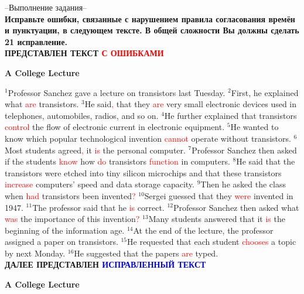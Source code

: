\documentclass[main.tex]{subfiles}
\begin{document}
--Выполнение задания--
\\

\textbf{Исправьте ошибки, связанные с нарушением правила согласования времён и пунктуации, в следующем тексте. В общей сложности Вы должны сделать 21 исправление.}
\\

\textbf{ПРЕДСТАВЛЕН ТЕКСТ \textcolor{red}{С ОШИБКАМИ}}

\centerline{\textbf{A College Lecture}}

$^1$Professor Sanchez gave a lecture on transistors last Tuesday.
$^2$First, he explained what \textcolor{red}{are} transistors.
$^3$He said\textcolor{red}{,} that they \textcolor{red}{are} very small electronic devices used in telephones, automobiles, radios, and so on.
$^4$He further explained that transistors \textcolor{red}{control} the flow of electronic current in electronic equipment.
$^5$He wanted to know which popular technological invention \textcolor{red}{cannot} operate without transistors.
$^6$Most students agreed\textcolor{red}{,} it \textcolor{red}{is} the personal computer.
$^7$Professor Sanchez then asked if the students \textcolor{red}{know} how \textcolor{red}{do} transistors \textcolor{red}{function} in computers.
$^8$He said that the transistors were etched into tiny silicon microchips and that these transistors \textcolor{red}{increase} computers' speed and data storage capacity.
$^9$Then he asked the class when \textcolor{red}{had} transistors been invented\textcolor{red}{?}
$^{10}$Sergei guessed that they \textcolor{red}{were} invented in 1947.
$^{11}$The professor said that he \textcolor{red}{is} correct.
$^{12}$Professor Sanchez then asked what \textcolor{red}{was} the importance of this invention\textcolor{red}{?}
$^{13}$Many students answered that it \textcolor{red}{is} the beginning of the information age.
$^{14}$At the end of the lecture, the professor assigned a paper on transistors.
$^{15}$He requested that each student \textcolor{red}{chooses} a topic by next Monday.
$^{16}$He suggested that the papers \textcolor{red}{are} typed.
\\

\textbf{ДАЛЕЕ ПРЕДСТАВЛЕН \textcolor{blue}{ИСПРАВЛЕННЫЙ ТЕКСТ}}

\centerline{\textbf{A College Lecture}}
\end{document}
